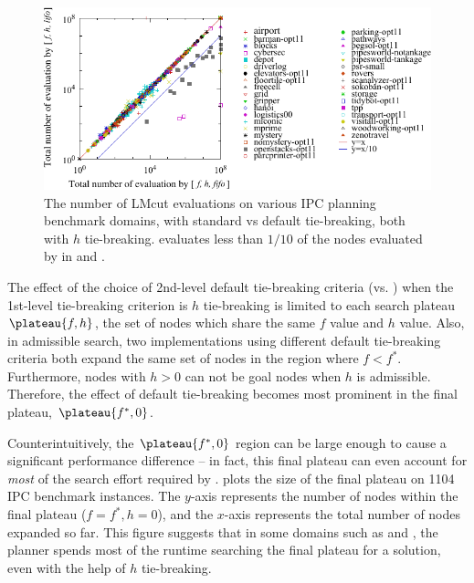 \begin{figure}[htbp]
 \centering {}
 \includegraphics[width=\linewidth]{tables/aaai16-30min-5min-cut/aaai16prelim3/evaluated-lmcut_ff-lmcut_lf.pdf}
 \caption{The number of LMcut evaluations on various IPC planning benchmark domains,
 with standard \fifo vs \lifo default tie-breaking, both with $h$
 tie-breaking. \lifo evaluates  less than $1/10$ of the nodes evaluated
 by \fifo in  and . 
 }
 \label{fig:f-h-eval}
\end{figure}

The effect of the choice of 2nd-level default tie-breaking criteria (\lifo vs.
\fifo)  when the 1st-level tie-breaking criterion is  $h$ tie-breaking is
limited to each search plateau $\plateau{f,h}$, the set of nodes which
share the same $f$ value and $h$ value.
% 
Also, in admissible search, two \astar implementations using 
different default tie-breaking criteria both expand the same set of
nodes in the region where $f<f^*$.
% 
Furthermore, nodes with $h>0$ can not be goal nodes when $h$ is admissible.
% 
Therefore, the effect of default tie-breaking becomes most prominent in the final plateau, $\plateau{f^*,0}$.

Counterintuitively, the $\plateau{f^*, 0}$ region can be large enough to
cause a significant performance difference -- in fact, this final plateau can even account for \emph{most} of the
search effort required by \astar.
 plots the size of the final plateau on 1104 IPC
benchmark instances.  The $y$-axis represents the number of nodes within
the final plateau ($f=f^*, h=0$), and the $x$-axis represents the total
number of nodes expanded so far. This figure suggests that in some
domains such as  and , the planner
spends most of the runtime searching the final plateau for a solution,
even with the help of $h$ tie-breaking.

